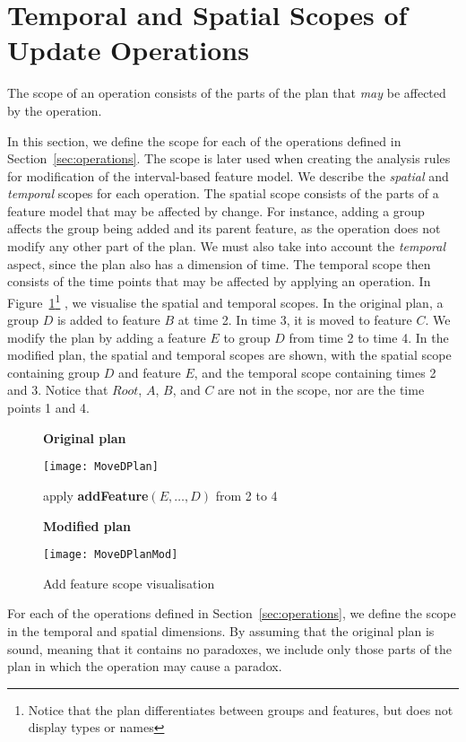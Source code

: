 
\section{Temporal and Spatial Scopes of Update Operations}
\label{sec:scope}

The scope of an operation consists of the parts of the plan that \emph{may} be affected by the operation. 

In this section, we define the scope for each of the operations defined in Section~\vref{sec:operations}. The scope is later used when creating the analysis rules for modification of the interval-based feature model. We describe the \emph{spatial} and \emph{temporal} scopes for each operation. The spatial scope consists of the parts of a feature model that may be affected by change. For instance, adding a group affects the group being added and its parent feature, as the operation does not modify any other part of the plan. We must also take into account the \emph{temporal} aspect, since the plan also has a dimension of time. The temporal scope then consists of the time points that may be affected by applying an operation. In Figure~\ref{ex:add-feature-scope}\footnote{Notice that the plan differentiates between groups and features, but does not display types or names} 
, we visualise the spatial and temporal scopes. In the original plan, a group $D$ is added to feature $B$ at time 2. In time 3, it is moved to feature $C$. We modify the plan by adding a feature $E$ to group $D$ from time 2 to time 4. In the modified plan, the spatial and temporal scopes are shown, with the spatial scope containing group $D$ and feature $E$, and the temporal scope containing times 2 and 3. Notice that $Root$, $A$, $B$, and $C$ are not in the scope, nor are the time points 1 and 4.
\begin{figure}[h]
  \centering
      \textbf{Original plan}

      \texttt{[image: MoveDPlan]}
      \bigskip
      
      apply \textbf{addFeature}$(E, \ldots, D)$ from 2 to 4  
      \bigskip

      \textbf{Modified plan}

      \texttt{[image: MoveDPlanMod]}
  \caption{Add feature scope visualisation}
  \label{ex:add-feature-scope}
\end{figure}

For each of the operations defined in Section~\vref{sec:operations}, we define the scope in the temporal and spatial dimensions. By assuming that the original plan is sound, meaning that it contains no paradoxes, we include only those parts of the plan in which the operation may cause a paradox.

